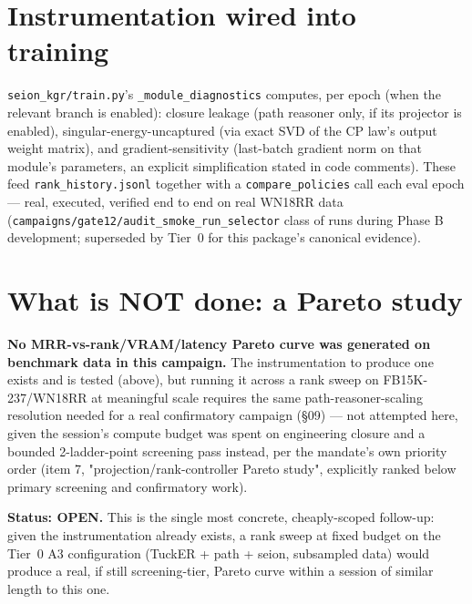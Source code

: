 \documentclass[11pt]{article}
\begin{document}
\section{Instrumentation wired into training}
\texttt{seion\_kgr/train.py}'s \texttt{\_module\_diagnostics} computes, per epoch (when the
relevant branch is enabled): closure leakage (path reasoner only, if its projector is enabled),
singular-energy-uncaptured (via exact SVD of the CP law's output weight matrix), and
gradient-sensitivity (last-batch gradient norm on that module's parameters, an explicit
simplification stated in code comments). These feed \texttt{rank\_history.jsonl} together with a
\texttt{compare\_policies} call each eval epoch --- real, executed, verified end to end on real
WN18RR data (\texttt{campaigns/gate12/audit\_smoke\_run\_selector} class of runs during Phase B
development; superseded by Tier~0 for this package's canonical evidence).

\section{What is NOT done: a Pareto study}
\label{sec:pareto}
\textbf{No MRR-vs-rank/VRAM/latency Pareto curve was generated on benchmark data in this
campaign.} The instrumentation to produce one exists and is tested (above), but running it across
a rank sweep on FB15K-237/WN18RR at meaningful scale requires the same path-reasoner-scaling
resolution needed for a real confirmatory campaign (\S09) --- not attempted here, given the
session's compute budget was spent on engineering closure and a bounded 2-ladder-point screening
pass instead, per the mandate's own priority order (item 7, "projection/rank-controller Pareto
study", explicitly ranked below primary screening and confirmatory work).

\textbf{Status: OPEN.} This is the single most concrete, cheaply-scoped follow-up: given the
instrumentation already exists, a rank sweep at fixed budget on the Tier~0 A3 configuration
(TuckER + path + seion, subsampled data) would produce a real, if still screening-tier, Pareto
curve within a session of similar length to this one.
\end{document}
